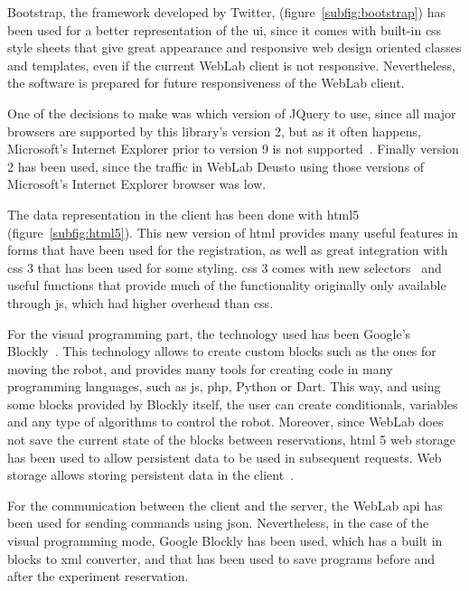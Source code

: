 Bootstrap, the framework developed by Twitter, (figure~\ref{subfig:bootstrap}) has been used for a
better representation of the \acrlong{ui}, since it comes with built-in \acrshort{css} style
sheets that give great appearance and responsive web design oriented classes and templates, even if
the current WebLab client is not responsive. Nevertheless, the software is prepared for future
responsiveness of the WebLab client.

One of the decisions to make was which version of JQuery to use, since all major browsers are
supported by this library's version 2, but as it often happens, Microsoft's Internet Explorer prior
to version 9 is not supported~\cite{jquery_versions}. Finally version 2 has been used, since the
traffic in WebLab Deusto using those versions of Microsoft's Internet Explorer browser was low.

The data representation in the client has been done with \acrshort{html}5~\cite{html5_spec}
(figure~\ref{subfig:html5}). This new version of \acrshort{html} provides many useful features in
forms that have been used for the registration, as well as great integration with \acrshort{css} 3
that has been used for some styling. \acrshort{css} 3 comes with new selectors~\cite{css3_sel} and
useful functions that provide much of the functionality originally only available through
\acrlong{js}, which had higher overhead than \acrshort{css}.

For the visual programming part, the technology used has been Google's Blockly~\cite{blockly}. This
technology allows to create custom blocks such as the ones for moving the robot, and provides many
tools for creating code in many programming languages, such as \acrlong{js}, \acrshort{php}, Python
or Dart. This way, and using some blocks provided by Blockly itself, the user can create
conditionals, variables and any type of algorithms to control the robot. Moreover, since WebLab does
not save the current state of the blocks between reservations, \acrshort{html} 5 web storage has
been used to allow persistent data to be used in subsequent requests. Web storage allows storing
persistent data in the client~\cite{web_storage}.

For the communication between the client and the server, the WebLab \acrshort{api} has been used for
sending commands using \acrshort{json}. Nevertheless, in the case of the visual programming mode,
Google Blockly has been used, which has a built in blocks to \acrshort{xml} converter, and that has
been used to save programs before and after the experiment reservation.

